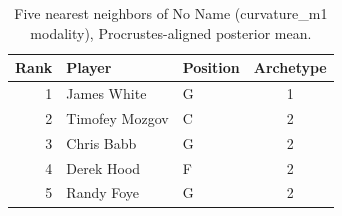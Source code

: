 \begin{table}[htbp]
  \centering\small
  \begin{tabular}{rllc}
    \toprule
    Rank & Player & Position & Archetype \\
    \midrule
    1 & James White & G & 1 \\
    2 & Timofey Mozgov & C & 2 \\
    3 & Chris Babb & G & 2 \\
    4 & Derek Hood & F & 2 \\
    5 & Randy Foye & G & 2 \\
    \bottomrule
  \end{tabular}
  \caption{Five nearest neighbors of No Name (curvature_m1 modality), Procrustes-aligned posterior mean.}
  \label{tab:No_Name_neighbors_curvature_m1}
\end{table}

